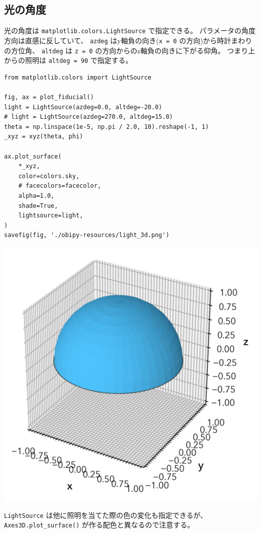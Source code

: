 \documentclass[a4paper, 10pt, notitlepage, twocolumn, uplatex, oneside, dvipdfmx]{jsarticle}
\begin{document}
\subsection{光の角度}
\label{sec:org146ab7a}
光の角度は \texttt{matplotlib.colors.LightSource} で指定できる。
パラメータの角度方向は直感に反していて、
\texttt{azdeg} はy軸負の向き(\texttt{x = 0} の方向)から時計まわりの方位角、
\texttt{altdeg} は \texttt{z = 0} の方向からのz軸負の向きに下がる仰角。
つまり上からの照明は \texttt{altdeg = 90} で指定する。
\begin{verbatim}
from matplotlib.colors import LightSource

fig, ax = plot_fiducial()
light = LightSource(azdeg=0.0, altdeg=-20.0)
# light = LightSource(azdeg=270.0, altdeg=15.0)
theta = np.linspace(1e-5, np.pi / 2.0, 10).reshape(-1, 1)
_xyz = xyz(theta, phi)

ax.plot_surface(
    *_xyz,
    color=colors.sky,
    # facecolors=facecolor,
    alpha=1.0,
    shade=True,
    lightsource=light,
)
savefig(fig, './obipy-resources/light_3d.png')
\end{verbatim}

\label{}
\begin{center}
\includegraphics[width=1.0\linewidth]{./obipy-resources/light_3d.png}
\end{center}

\texttt{LightSource} は他に照明を当てた際の色の変化も指定できるが、
\texttt{Axes3D.plot\_surface()} が作る配色と異なるので注意する。
\end{document}
